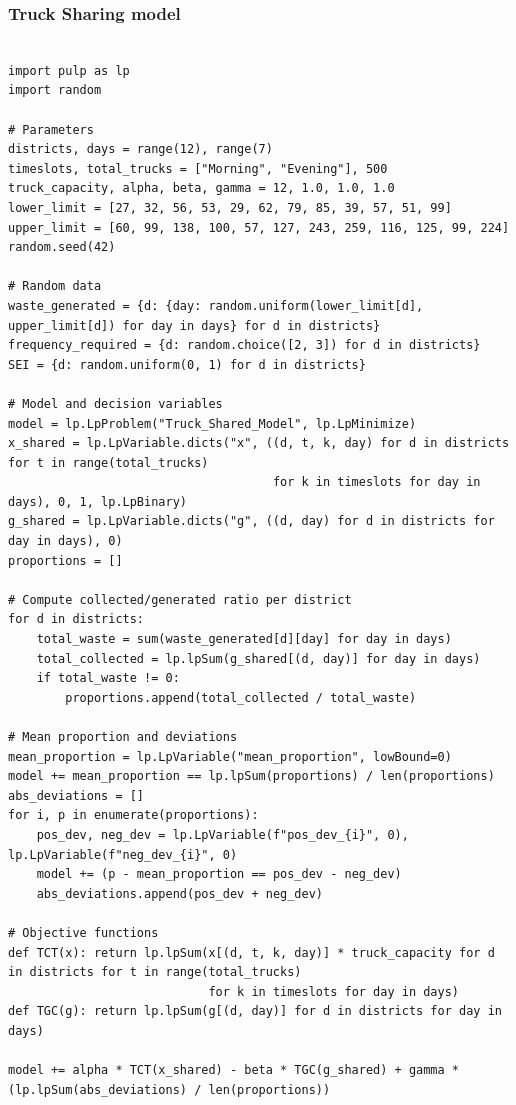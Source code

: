 \documentclass{article}
\begin{document}
\subsubsection{Truck Sharing model}

\begin{verbatim}

import pulp as lp
import random

# Parameters
districts, days = range(12), range(7)
timeslots, total_trucks = ["Morning", "Evening"], 500
truck_capacity, alpha, beta, gamma = 12, 1.0, 1.0, 1.0
lower_limit = [27, 32, 56, 53, 29, 62, 79, 85, 39, 57, 51, 99]
upper_limit = [60, 99, 138, 100, 57, 127, 243, 259, 116, 125, 99, 224]
random.seed(42)

# Random data
waste_generated = {d: {day: random.uniform(lower_limit[d], upper_limit[d]) for day in days} for d in districts}
frequency_required = {d: random.choice([2, 3]) for d in districts}
SEI = {d: random.uniform(0, 1) for d in districts}

# Model and decision variables
model = lp.LpProblem("Truck_Shared_Model", lp.LpMinimize)
x_shared = lp.LpVariable.dicts("x", ((d, t, k, day) for d in districts for t in range(total_trucks)
                                     for k in timeslots for day in days), 0, 1, lp.LpBinary)
g_shared = lp.LpVariable.dicts("g", ((d, day) for d in districts for day in days), 0)
proportions = []

# Compute collected/generated ratio per district
for d in districts:
    total_waste = sum(waste_generated[d][day] for day in days)
    total_collected = lp.lpSum(g_shared[(d, day)] for day in days)
    if total_waste != 0:
        proportions.append(total_collected / total_waste)

# Mean proportion and deviations
mean_proportion = lp.LpVariable("mean_proportion", lowBound=0)
model += mean_proportion == lp.lpSum(proportions) / len(proportions)
abs_deviations = []
for i, p in enumerate(proportions):
    pos_dev, neg_dev = lp.LpVariable(f"pos_dev_{i}", 0), lp.LpVariable(f"neg_dev_{i}", 0)
    model += (p - mean_proportion == pos_dev - neg_dev)
    abs_deviations.append(pos_dev + neg_dev)

# Objective functions
def TCT(x): return lp.lpSum(x[(d, t, k, day)] * truck_capacity for d in districts for t in range(total_trucks)
                            for k in timeslots for day in days)
def TGC(g): return lp.lpSum(g[(d, day)] for d in districts for day in days)

model += alpha * TCT(x_shared) - beta * TGC(g_shared) + gamma * (lp.lpSum(abs_deviations) / len(proportions))


\end{verbatim}
\end{document}
